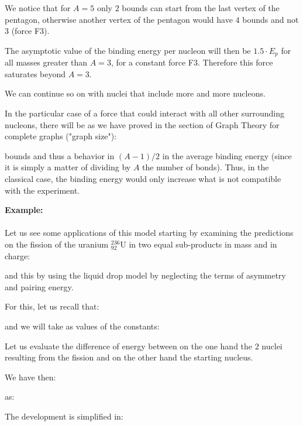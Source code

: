 	\begin{tcolorbox}[title=Remark,colframe=black,arc=10pt]
	We notice that for $A = 5$ only $2$ bounds can start from the last vertex of the pentagon, otherwise another vertex of the pentagon would have $4$ bounds and not $3$ (force F3).
	\end{tcolorbox}
	The asymptotic value of the binding energy per nucleon will then be $1.5\cdot E_p$ for all masses greater than $A = 3$, for a constant force F3. Therefore this force saturates beyond $A = 3$.

	We can continue so on with nuclei that include more and more nucleons.

	In the particular case of a force that could interact with all other surrounding nucleons, there will be as we have proved in the section of Graph Theory for complete graphs ("graph size"):
	
	bounds and thus a behavior in $(A-1)/2$ in the average binding energy (since it is simply a matter of dividing by $A$ the number of bonds). Thus, in the classical case, the binding energy would only increase what is not compatible with the experiment.
	
	\pagebreak
	\begin{tcolorbox}[colframe=black,colback=white,sharp corners]
	\textbf{{\Large {}}Example:}\\\\
	Let us see some applications of this model starting by examining the predictions on the fission of the uranium $_{92}^{236}\mathrm{U}$ in two equal sub-products in mass and in charge:
	
	and this by using the liquid drop model by neglecting the terms of asymmetry and pairing energy.

	For this, let us recall that:
	
	and we will take as values of the constants:
	
	Let us evaluate the difference of energy between on the one hand the $2$ nuclei resulting from the fission and on the other hand the starting nucleus.

	We have then:
	
	as:
	
	The development is simplified in:
	
	\end{tcolorbox}
	
